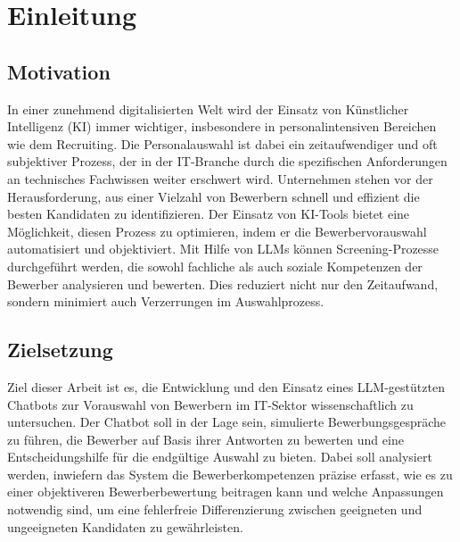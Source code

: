 
\chapter{Einleitung}

\section{Motivation}

In einer zunehmend digitalisierten Welt wird der Einsatz von Künstlicher Intelligenz (\acs{KI}) immer wichtiger, insbesondere in personalintensiven Bereichen wie dem Recruiting. 
Die Personalauswahl ist dabei ein zeitaufwendiger und oft subjektiver Prozess, der in der IT-Branche durch die spezifischen Anforderungen an technisches Fachwissen weiter erschwert wird. 
Unternehmen stehen vor der Herausforderung, aus einer Vielzahl von Bewerbern schnell und effizient die besten Kandidaten zu identifizieren. 
Der Einsatz von \acs{KI}-Tools bietet eine Möglichkeit, diesen Prozess zu optimieren, indem er die Bewerbervorauswahl automatisiert und objektiviert. 
Mit Hilfe von \acp{LLM} können Screening-Prozesse durchgeführt werden, die sowohl fachliche als auch soziale Kompetenzen der Bewerber analysieren und bewerten. 
Dies reduziert nicht nur den Zeitaufwand, sondern minimiert auch Verzerrungen im Auswahlprozess.

\section{Zielsetzung}

Ziel dieser Arbeit ist es, die Entwicklung und den Einsatz eines \ac{LLM}-gestützten Chatbots zur Vorauswahl von Bewerbern im IT-Sektor wissenschaftlich zu untersuchen. 
Der Chatbot soll in der Lage sein, simulierte Bewerbungsgespräche zu führen, die Bewerber auf Basis ihrer Antworten zu bewerten und eine Entscheidungshilfe für die endgültige Auswahl zu bieten. 
Dabei soll analysiert werden, inwiefern das System die Bewerberkompetenzen präzise erfasst, wie es zu einer objektiveren Bewerberbewertung beitragen kann und welche Anpassungen notwendig sind, um eine fehlerfreie Differenzierung zwischen geeigneten und ungeeigneten Kandidaten zu gewährleisten.
